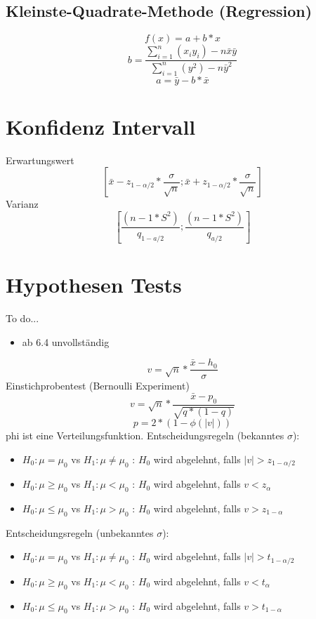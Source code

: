 \documentclass{article}
\begin{document}
	\subsection{Kleinste-Quadrate-Methode (Regression)}
	\[f(x)=a+b*x\]
	\[b = \frac{\sum_{i=1}^{n}(x_i y_i)-n\bar{x}\bar{y}}{\sum_{i=1}^{n}(y^2)-n\bar{y}^2}\]
	\[a=\bar{y}-b*\bar{x}\]
	\section{Konfidenz Intervall}
	Erwartungswert
	\[[\bar{x}-z_{1-\alpha/2}*\frac{\sigma}{\sqrt{n}};\bar{x}+z_{1-\alpha/2}*\frac{\sigma}{\sqrt{n}}]\]
	Varianz
	\[[\frac{(n-1*S^2)}{q_{1-a/2}};\frac{(n-1*S^2)}{q_{a/2}}]\]
	\section{Hypothesen Tests}
	To do...
	\begin{itemize}
		\item ab 6.4 unvollständig 
	\end{itemize}
	\[v=\sqrt{n}*\frac{\bar{x}-h_0}{\sigma}\]
	Einstichprobentest (Bernoulli Experiment)
	\[v=\sqrt{n}*\frac{\bar{x}-p_0}{\sqrt{q*(1-q)}}\]
	\linebreak 
	\[p=2*(1-\phi(|v|))\]
	phi ist eine Verteilungsfunktion.
	\linebreak
	Entscheidungsregeln (bekanntes $\sigma$):
	\begin{itemize}
		\item $H_0 : \mu = \mu_0$ vs $H_1 : \mu \ne \mu_0$ : $H_0$ wird abgelehnt, falls $|v| > z_{1-\alpha/2}$
		\item $H_0 : \mu \ge \mu_0$ vs $H_1 : \mu < \mu_0$ : $H_0$ wird abgelehnt, falls $v < z_{\alpha}$
		\item $H_0 : \mu \le \mu_0$ vs $H_1 : \mu > \mu_0$ : $H_0$ wird abgelehnt, falls $v > z_{1-\alpha}$
	\end{itemize}
	Entscheidungsregeln (unbekanntes $\sigma$):
	\begin{itemize}
		\item $H_0 : \mu = \mu_0$ vs $H_1 : \mu \ne \mu_0$ : $H_0$ wird abgelehnt, falls $|v| > t_{1-\alpha/2}$
		\item $H_0 : \mu \ge \mu_0$ vs $H_1 : \mu < \mu_0$ : $H_0$ wird abgelehnt, falls $v < t_{\alpha}$
		\item $H_0 : \mu \le \mu_0$ vs $H_1 : \mu > \mu_0$ : $H_0$ wird abgelehnt, falls $v > t_{1-\alpha}$
	\end{itemize}
\end{document}
